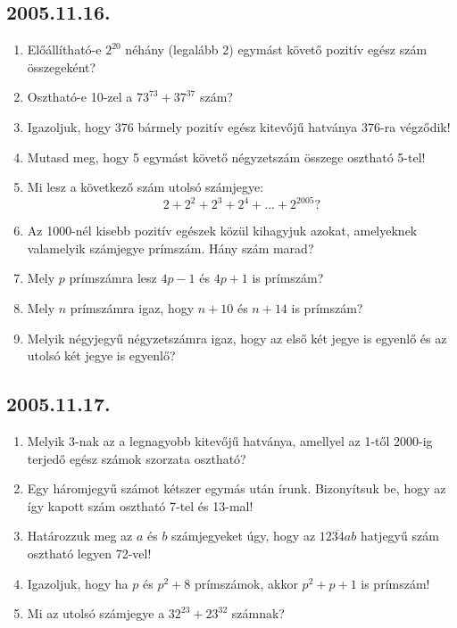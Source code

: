 \documentclass{article}
\begin{document}
\subsection*{2005.11.16.}
\begin{enumerate}
 
\item Előállítható-e $2^{20}$ néhány (legalább 2) egymást követő pozitív egész szám összegeként?

\item Osztható-e 10-zel a $73^{73}+37^{37}$ szám?

\item Igazoljuk, hogy 376 bármely pozitív egész kitevőjű hatványa 376-ra végződik!

\item Mutasd meg, hogy 5 egymást követő négyzetszám összege osztható 5-tel! 

\item Mi lesz a következő szám utolsó számjegye: $$2+2^2+2^3+2^4+...+2^{2005}?$$

\item Az 1000-nél kisebb pozitív egészek közül kihagyjuk azokat, amelyeknek valamelyik számjegye prímszám. Hány szám marad?

\item Mely $p$ prímszámra lesz $4p-1$ és $4p+1$ is prímszám?

\item Mely $n$ prímszámra igaz, hogy $n+10$ és $n+14$ is prímszám?

\item Melyik négyjegyű négyzetszámra igaz, hogy az első két jegye is egyenlő és az utolsó két jegye is egyenlő?
\end{enumerate}

\subsection*{2005.11.17.}
\begin{enumerate}
\item Melyik 3-nak az a legnagyobb kitevőjű hatványa, amellyel az 1-től 2000-ig terjedő egész számok szorzata osztható?
\item Egy háromjegyű számot kétszer egymás után írunk. Bizonyítsuk be, hogy az így kapott szám osztható 7-tel és 13-mal!
\item Határozzuk meg az $a$ és $b$ számjegyeket úgy, hogy az $\overline{1234ab}$ hatjegyű szám osztható legyen 72-vel!
\item Igazoljuk, hogy ha $p$ és $p^2+8$ prímszámok,
akkor $p^2+p+1$ is prímszám!
\item Mi az utolsó számjegye a $32^{23}+23^{32}$ számnak?
\end{enumerate}
\end{document}
